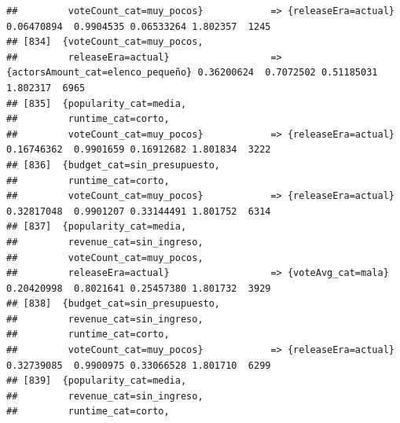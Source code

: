\documentclass[
]{article}
\begin{document}
\begin{verbatim}
##         voteCount_cat=muy_pocos}            => {releaseEra=actual}               0.06470894  0.9904535 0.06533264 1.802357  1245
## [834]  {voteCount_cat=muy_pocos,                                                                                                
##         releaseEra=actual}                  => {actorsAmount_cat=elenco_pequeño} 0.36200624  0.7072502 0.51185031 1.802317  6965
## [835]  {popularity_cat=media,                                                                                                   
##         runtime_cat=corto,                                                                                                      
##         voteCount_cat=muy_pocos}            => {releaseEra=actual}               0.16746362  0.9901659 0.16912682 1.801834  3222
## [836]  {budget_cat=sin_presupuesto,                                                                                             
##         runtime_cat=corto,                                                                                                      
##         voteCount_cat=muy_pocos}            => {releaseEra=actual}               0.32817048  0.9901207 0.33144491 1.801752  6314
## [837]  {popularity_cat=media,                                                                                                   
##         revenue_cat=sin_ingreso,                                                                                                
##         voteCount_cat=muy_pocos,                                                                                                
##         releaseEra=actual}                  => {voteAvg_cat=mala}                0.20420998  0.8021641 0.25457380 1.801732  3929
## [838]  {budget_cat=sin_presupuesto,                                                                                             
##         revenue_cat=sin_ingreso,                                                                                                
##         runtime_cat=corto,                                                                                                      
##         voteCount_cat=muy_pocos}            => {releaseEra=actual}               0.32739085  0.9900975 0.33066528 1.801710  6299
## [839]  {popularity_cat=media,                                                                                                   
##         revenue_cat=sin_ingreso,                                                                                                
##         runtime_cat=corto,                                                                                                      

\end{verbatim}
\end{document}

